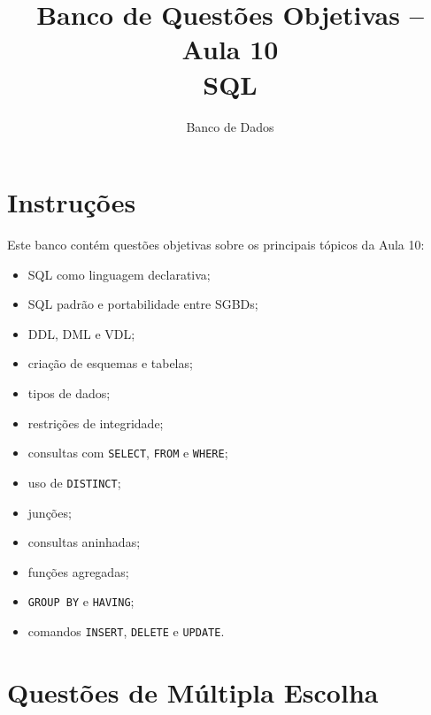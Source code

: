\documentclass[12pt,a4paper]{article}
\title{Banco de Questões Objetivas -- Aula 10\\SQL}
\author{Banco de Dados}
\date{}
\begin{document}
\maketitle

\section*{Instruções}

Este banco contém questões objetivas sobre os principais tópicos da Aula 10:
\begin{itemize}
    \item SQL como linguagem declarativa;
    \item SQL padrão e portabilidade entre SGBDs;
    \item DDL, DML e VDL;
    \item criação de esquemas e tabelas;
    \item tipos de dados;
    \item restrições de integridade;
    \item consultas com \texttt{SELECT}, \texttt{FROM} e \texttt{WHERE};
    \item uso de \texttt{DISTINCT};
    \item junções;
    \item consultas aninhadas;
    \item funções agregadas;
    \item \texttt{GROUP BY} e \texttt{HAVING};
    \item comandos \texttt{INSERT}, \texttt{DELETE} e \texttt{UPDATE}.
\end{itemize}

\section{Questões de Múltipla Escolha}
\end{document}
